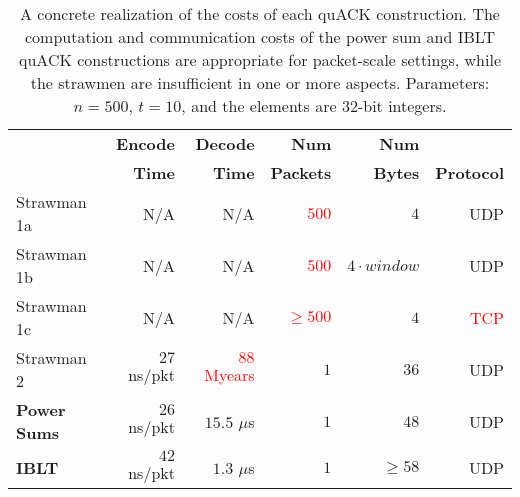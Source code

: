 \begin{table}[t]
\centering
\begin{tabular}{lrrrrr}
  \toprule
  & \bf Encode & \bf Decode & \bf Num & \bf Num \\
  & \bf Time & \bf Time & \bf Packets & \bf Bytes & \bf Protocol \\
  \midrule
  Strawman 1a & N/A & N/A & \textcolor{red}{$500$} & $4$ & UDP \\
  Strawman 1b & N/A & N/A & \textcolor{red}{$500$} & $4 \cdot window$ & UDP \\
  Strawman 1c & N/A & N/A & \textcolor{red}{$\geq 500$} & $4$ & \textcolor{red}{TCP} \\
  Strawman 2 & $27$ ns/pkt & \textcolor{red}{$88$ Myears} & $1$ & $36$ & UDP \\
  \rowcolor{yellow}
  \bf Power Sums & $26$ ns/pkt & $15.5$ $\mu$s & $1$ & $48$ & UDP \\
  \rowcolor{yellow}
  \bf IBLT & $42$ ns/pkt & $1.3$ $\mu$s & $1$ & $\geq 58$ & UDP \\
  \bottomrule
\end{tabular}
\caption{A concrete realization of the costs of each quACK construction.
The computation and communication costs of the power sum and IBLT
quACK constructions are appropriate for packet-scale settings, while the
strawmen are insufficient in one or more aspects.
Parameters: $n=500$, $t=10$, and the elements are 32-bit integers.}
\label{tab:quack:practical}
\end{table}
